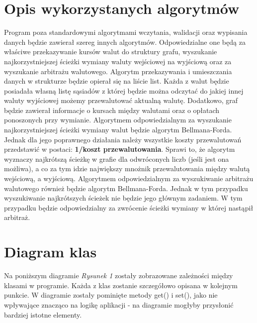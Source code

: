 ﻿\documentclass[12pt]{article}
\begin{document}
\section{Opis wykorzystanych algorytmów}
Program poza standardowymi algorytmami wczytania, walidacji oraz wypisania danych będzie zawierał szereg innych algorytmów. Odpowiedzialne one będą za właściwe przekazywanie kursów walut do struktury grafu, wyszukanie najkorzystniejszej ścieżki wymiany waluty wejściowej na wyjściową oraz za wyszukanie arbitrażu walutowego.
\newline\newline
Algorytm przekazywania i umieszczania danych w strukturze będzie opierał się na liście list. Każda z walut będzie posiadała własną listę sąsiadów z której będzie można odczytać do jakiej innej waluty wyjściowej możemy przewalutować aktualną walutę. Dodatkowo, graf będzie zawierał informacje o kursach między walutami oraz o opłatach ponoszonych przy wymianie.
\newline\newline
Algorytmem odpowiedzialnym za wyszukanie najkorzystniejszej ścieżki wymiany walut będzie algorytm Bellmana-Forda. Jednak dla jego poprawnego działania należy wszystkie koszty przewalutowań przedstawić w postaci: \textbf{1/koszt przewalutowania}. Sprawi to, że algorytm wyznaczy najkrótszą ścieżkę w grafie dla odwróconych liczb (jeśli jest ona możliwa), a co za tym idzie największy mnożnik przewalutowania między walutą wejściową, a wyjściową.
\newline\newline
Algorytmem odpowiedzialnym za wyszukiwanie arbitrażu walutowego również będzie algorytm Bellmana-Forda. Jednak w tym przypadku wyszukiwanie najkrótszych ścieżek nie będzie jego głównym zadaniem. W tym przypadku będzie odpowiedzialny za zwrócenie ścieżki wymiany w której nastąpił arbitraż.


 
\section{Diagram klas}
Na poniższym diagramie \emph{Rysunek 1} zostały zobrazowane zależności między klasami w programie. Każda z klas zostanie szczegółowo opisana w kolejnym punkcie. W diagramie zostały pominięte metody get() i set(), jako nie wpływające znacząco na logikę aplikacji - na diagramie mogłyby przysłonić bardziej istotne elementy.
\end{document}
